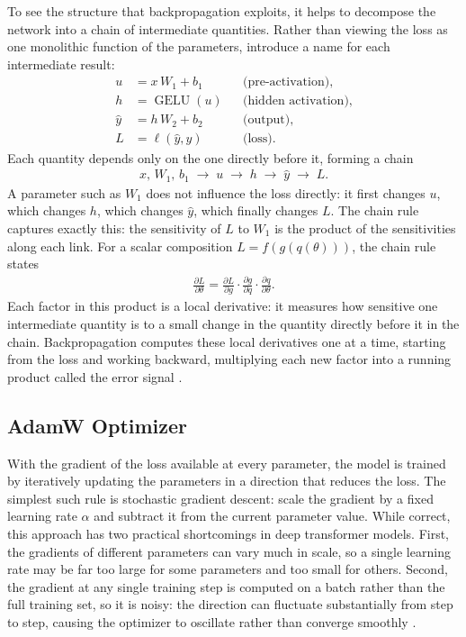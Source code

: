 To see the structure that backpropagation exploits, it helps to decompose the network into a chain of intermediate quantities. Rather than viewing the loss as one monolithic function of the parameters, introduce a name for each intermediate result:
\begin{align*}
    u &= x\, W_1 + b_1           &&\text{(pre-activation)},   \\
    h &= \operatorname{GELU}(u)   &&\text{(hidden activation)}, \\
    \hat{y} &= h\, W_2 + b_2     &&\text{(output)}, \\
    L &= \ell(\hat{y}, y)            &&\text{(loss)}.
\end{align*}
Each quantity depends only on the one directly before it, forming a chain
\begin{align*}
    x,\, W_1,\, b_1 \;\longrightarrow\; u \;\longrightarrow\; h \;\longrightarrow\; \hat{y} \;\longrightarrow\; L.
\end{align*}
A parameter such as $W_1$ does not influence the loss directly: it first changes $u$, which changes $h$, which changes $\hat{y}$, which finally changes $L$. The chain rule captures exactly this: the sensitivity of $L$ to $W_1$ is the product of the sensitivities along each link. For a scalar composition $L = f(g(q(\theta)))$, the chain rule states
\begin{align}\label{eq:chain_rule}
    \frac{\partial L}{\partial \theta}
    = \frac{\partial L}{\partial g} \cdot \frac{\partial g}{\partial q} \cdot \frac{\partial q}{\partial \theta}.
\end{align}
Each factor in this product is a local derivative: it measures how sensitive one intermediate quantity is to a small change in the quantity directly before it in the chain. Backpropagation computes these local derivatives one at a time, starting from the loss and working backward, multiplying each new factor into a running product called the error signal \citep{Goodfellow2016}.

\subsection{AdamW Optimizer} \label{sec:adamw}
With the gradient of the loss available at every parameter, the model is trained by iteratively updating the parameters in a direction that reduces the loss. The simplest such rule is stochastic gradient descent: scale the gradient by a fixed learning rate $\alpha$ and subtract it from the current parameter value. While correct, this approach has two practical shortcomings in deep transformer models. First, the gradients of different parameters can vary much in scale, so a single learning rate may be far too large for some parameters and too small for others. Second, the gradient at any single training step is computed on a batch rather than the full training set, so it is noisy: the direction can fluctuate substantially from step to step, causing the optimizer to oscillate rather than converge smoothly \citep{Adam}.

